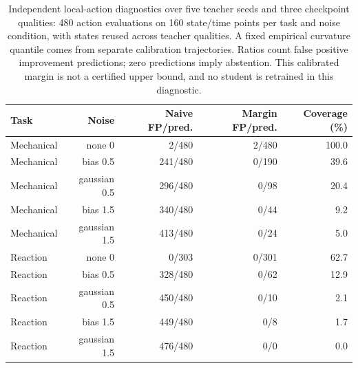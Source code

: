 \begin{table}[htbp]\centering\small\setlength{\tabcolsep}{4pt}
\begin{tabular}{@{}lrrrr@{}}\toprule
Task & Noise & Naive FP/pred. & Margin FP/pred. & Coverage (\%)\\\midrule
Mechanical & none 0 & 2/480 & 2/480 & 100.0\\
Mechanical & bias 0.5 & 241/480 & 0/190 & 39.6\\
Mechanical & gaussian 0.5 & 296/480 & 0/98 & 20.4\\
Mechanical & bias 1.5 & 340/480 & 0/44 & 9.2\\
Mechanical & gaussian 1.5 & 413/480 & 0/24 & 5.0\\
Reaction & none 0 & 0/303 & 0/301 & 62.7\\
Reaction & bias 0.5 & 328/480 & 0/62 & 12.9\\
Reaction & gaussian 0.5 & 450/480 & 0/10 & 2.1\\
Reaction & bias 1.5 & 449/480 & 0/8 & 1.7\\
Reaction & gaussian 1.5 & 476/480 & 0/0 & 0.0\\
\bottomrule\end{tabular}
\caption{Independent local-action diagnostics over five teacher seeds and three checkpoint qualities: 480 action evaluations on 160 state/time points per task and noise condition, with states reused across teacher qualities. A fixed empirical curvature quantile comes from separate calibration trajectories. Ratios count false positive improvement predictions; zero predictions imply abstention. This calibrated margin is not a certified upper bound, and no student is retrained in this diagnostic.}
\end{table}
